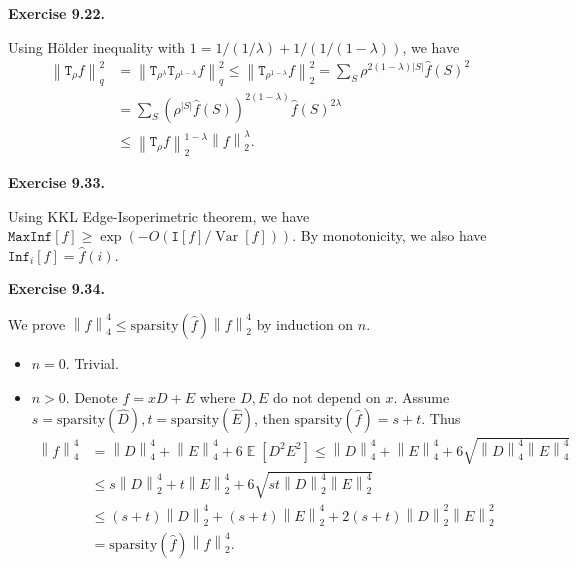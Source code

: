 \documentclass[a4paper]{article}
\newenvironment{exercise}[1]{
	\par
	\noindent\textbf{Exercise #1.}\quad
}{
	\par
	\bigskip
}
\DeclareMathOperator*{\E}{\mathbb E}
\DeclareMathOperator{\Var}{\mathrm{Var}}
\newcommand{\vabs}[1]{{\left\| #1 \right\|}}
\newcommand{\pbra}[1]{{\left( #1 \right)}}
\newcommand{\sbra}[1]{{\left[ #1 \right]}}
\newcommand{\Inf}{\mathtt{Inf}}
\newcommand{\MaxInf}{\mathtt{MaxInf}}
\newcommand{\Itt}{\mathtt{I}}
\newcommand{\Ttt}{\mathtt{T}}
\begin{document}
\begin{exercise}{9.22}
    Using H\"older inequality with $1=1/(1/\lambda)+1/(1/(1-\lambda))$, we have
    \begin{align*}
    \vabs{\Ttt_\rho f}_q^2
        &=\vabs{\Ttt_{\rho^\lambda}\Ttt_{\rho^{1-\lambda}}f}_q^2\leq\vabs{\Ttt_{\rho^{1-\lambda}}f}_2^2
    =\sum_S\rho^{2(1-\lambda)|S|}\hat f(S)^2\\
        &=\sum_S\pbra{\rho^{|S|}\hat f(S)}^{2(1-\lambda)}\hat f(S)^{2\lambda}\\
        &\leq\vabs{\Ttt_\rho f}_2^{1-\lambda}\vabs{f}_2^\lambda.
    \end{align*}
\end{exercise}

\begin{exercise}{9.33}
    Using KKL Edge-Isoperimetric theorem, we have $\MaxInf[f]\geq\exp(-O(\Itt[f]/\Var[f]))$.
    By monotonicity, we also have $\Inf_i[f]=\hat f(i)$.
\end{exercise}

\begin{exercise}{9.34}
    We prove $\vabs{f}_4^4\leq\text{sparsity}(\hat f)\vabs{f}_2^4$ by induction on $n$.
    \begin{itemize}
        \item $n=0$. Trivial.
        \item $n>0$. Denote $f=xD+E$ where $D,E$ do not depend on $x$. 
            Assume $s=\text{sparsity}(\hat D),t=\text{sparsity}(\hat E)$, then $\text{sparsity}(\hat f)=s+t$.
            Thus
            \begin{align*}
            \vabs{f}_4^4
                &=\vabs{D}_4^4+\vabs{E}_4^4+6\E\sbra{D^2E^2}\leq\vabs{D}_4^4+\vabs{E}_4^4+6\sqrt{\vabs{D}_4^4\vabs{E}_4^4}\\
                &\leq s\vabs{D}_2^4+t\vabs{E}_2^4+6\sqrt{st\vabs{D}_2^4\vabs{E}_2^4}\\
                &\leq (s+t)\vabs{D}_2^4+(s+t)\vabs{E}_2^4+2(s+t)\vabs{D}_2^2\vabs{E}_2^2\\
                &=\text{sparsity}(\hat f)\vabs{f}_2^4.
            \end{align*}
    \end{itemize}
\end{exercise}
\end{document}

